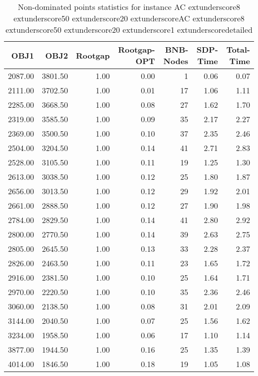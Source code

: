 \begin{table}
\caption{Non-dominated points statistics for instance AC	extunderscore8	extunderscore50	extunderscore20	extunderscoreAC	extunderscore8	extunderscore50	extunderscore20	extunderscore1	extunderscoredetailed}
\label{tab:stats/AC_8_50_20_AC_8_50_20_1_detailed}
\begin{tabular}{rrrrrrr}
\toprule
OBJ1 & OBJ2 & Rootgap & Rootgap-OPT & BNB-Nodes & SDP-Time & Total-Time \\
\midrule
2087.00 & 3801.50 & 1.00 & 0.00 & 1 & 0.06 & 0.07 \\
2111.00 & 3702.50 & 1.00 & 0.01 & 17 & 1.06 & 1.11 \\
2285.00 & 3668.50 & 1.00 & 0.08 & 27 & 1.62 & 1.70 \\
2319.00 & 3585.50 & 1.00 & 0.09 & 35 & 2.17 & 2.27 \\
2369.00 & 3500.50 & 1.00 & 0.10 & 37 & 2.35 & 2.46 \\
2504.00 & 3204.50 & 1.00 & 0.14 & 41 & 2.71 & 2.83 \\
2528.00 & 3105.50 & 1.00 & 0.11 & 19 & 1.25 & 1.30 \\
2613.00 & 3038.50 & 1.00 & 0.12 & 25 & 1.80 & 1.87 \\
2656.00 & 3013.50 & 1.00 & 0.12 & 29 & 1.92 & 2.01 \\
2661.00 & 2888.50 & 1.00 & 0.12 & 27 & 1.90 & 1.98 \\
2784.00 & 2829.50 & 1.00 & 0.14 & 41 & 2.80 & 2.92 \\
2800.00 & 2770.50 & 1.00 & 0.14 & 39 & 2.63 & 2.75 \\
2805.00 & 2645.50 & 1.00 & 0.13 & 33 & 2.28 & 2.37 \\
2826.00 & 2463.50 & 1.00 & 0.11 & 23 & 1.65 & 1.72 \\
2916.00 & 2381.50 & 1.00 & 0.10 & 25 & 1.64 & 1.71 \\
2970.00 & 2220.50 & 1.00 & 0.10 & 35 & 2.36 & 2.46 \\
3060.00 & 2138.50 & 1.00 & 0.08 & 31 & 2.01 & 2.09 \\
3144.00 & 2040.50 & 1.00 & 0.07 & 25 & 1.56 & 1.62 \\
3234.00 & 1958.50 & 1.00 & 0.06 & 17 & 1.10 & 1.14 \\
3877.00 & 1944.50 & 1.00 & 0.16 & 25 & 1.35 & 1.39 \\
4014.00 & 1846.50 & 1.00 & 0.18 & 19 & 1.05 & 1.08 \\
\bottomrule
\end{tabular}
\end{table}

